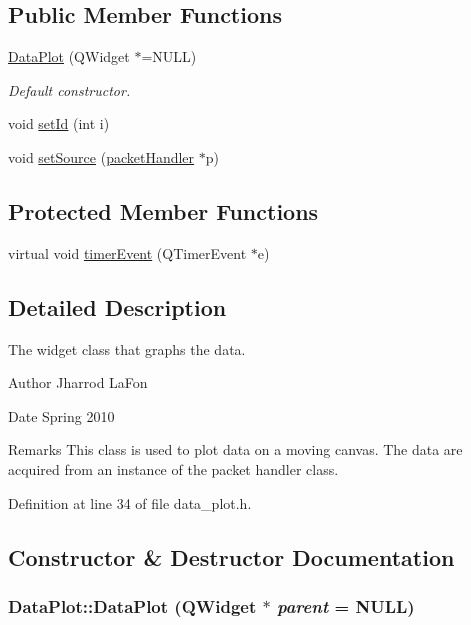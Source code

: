\subsection*{Public Member Functions}
\begin{DoxyCompactItemize}
\item 
\hyperlink{classDataPlot_a1343acbd6095212532c4315d6e9f1711}{DataPlot} (QWidget $\ast$=NULL)
\begin{DoxyCompactList}\small\item\em Default constructor. \item\end{DoxyCompactList}\item 
void \hyperlink{classDataPlot_ab6af06dfac3585a7dc669ea333a0869d}{setId} (int i)
\item 
void \hyperlink{classDataPlot_aace03b9e68e11042c0fade588e2869a7}{setSource} (\hyperlink{classpacketHandler}{packetHandler} $\ast$p)
\end{DoxyCompactItemize}
\subsection*{Protected Member Functions}
\begin{DoxyCompactItemize}
\item 
virtual void \hyperlink{classDataPlot_a41c9c4bc12d8d3e3abdf893c4fcfad7b}{timerEvent} (QTimerEvent $\ast$e)
\end{DoxyCompactItemize}


\subsection{Detailed Description}
The widget class that graphs the data. \begin{DoxyAuthor}{Author}
Jharrod LaFon 
\end{DoxyAuthor}
\begin{DoxyDate}{Date}
Spring 2010 
\end{DoxyDate}
\begin{DoxyRemark}{Remarks}
This class is used to plot data on a moving canvas. The data are acquired from an instance of the packet handler class. 
\end{DoxyRemark}


Definition at line 34 of file data\_\-plot.h.



\subsection{Constructor \& Destructor Documentation}
\hypertarget{classDataPlot_a1343acbd6095212532c4315d6e9f1711}{
\subsubsection[{DataPlot}]{\setlength{\rightskip}{0pt plus 5cm}DataPlot::DataPlot (QWidget $\ast$ {\em parent} = {\ttfamily NULL})}}
\label{classDataPlot_a1343acbd6095212532c4315d6e9f1711}


